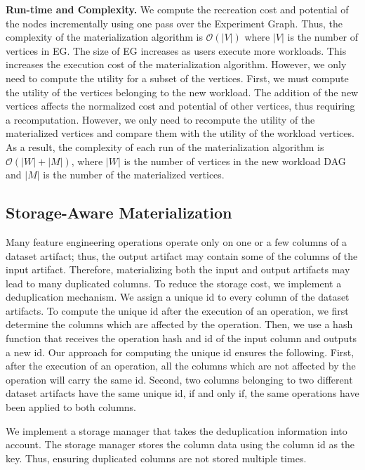 \textbf{Run-time and Complexity.}
We compute the recreation cost and potential of the nodes incrementally using one pass over the Experiment Graph.
Thus, the complexity of the materialization algorithm is $\mathcal{O}(|V|)$ where $|V|$ is the number of vertices in EG.
The size of EG increases as users execute more workloads.
This increases the execution cost of the materialization algorithm.
However, we only need to compute the utility for a subset of the vertices. 
First, we must compute the utility of the vertices belonging to the new workload.
The addition of the new vertices affects the normalized cost and potential of other vertices, thus requiring a recomputation.
However, we only need to recompute the utility of the materialized vertices and compare them with the utility of the workload vertices.
As a result, the complexity of each run of the materialization algorithm is $\mathcal{O}(|W| + |M|)$, where $|W|$ is the number of vertices in the new workload DAG and $|M|$ is the number of the materialized vertices.

\subsection{Storage-Aware Materialization}\label{subsec-storage-aware}
Many feature engineering operations operate only on one or a few columns of a dataset artifact; thus, the output artifact may contain some of the columns of the input artifact.
Therefore, materializing both the input and output artifacts may lead to many duplicated columns.
To reduce the storage cost, we implement a deduplication mechanism.
We assign a unique id to every column of the dataset artifacts.
To compute the unique id after the execution of an operation, we first determine the columns which are affected by the operation.
Then, we use a hash function that receives the operation hash and id of the input column and outputs a new id.
Our approach for computing the unique id ensures the following.
First, after the execution of an operation, all the columns which are not affected by the operation will carry the same id.
Second, two columns belonging to two different dataset artifacts have the same unique id, if and only if, the same operations have been applied to both columns.

We implement a storage manager that takes the deduplication information into account.
The storage manager stores the column data using the column id as the key.
Thus, ensuring duplicated columns are not stored multiple times.

